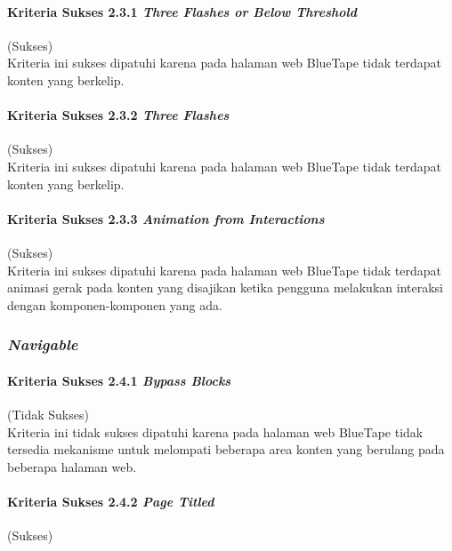 \paragraph{Kriteria Sukses 2.3.1 \textit{Three Flashes or Below Threshold}}
\label{par:kepatuhan_bluetape_kriteria_sukses_2.3.1}
(Sukses)\\

Kriteria ini sukses dipatuhi karena pada halaman web BlueTape tidak terdapat konten yang berkelip.

\paragraph{Kriteria Sukses 2.3.2 \textit{Three Flashes}}
\label{par:kepatuhan_bluetape_kriteria_sukses_2.3.2}
(Sukses)\\

Kriteria ini sukses dipatuhi karena pada halaman web BlueTape tidak terdapat konten yang berkelip.

\paragraph{Kriteria Sukses 2.3.3 \textit{Animation from Interactions}}
\label{par:kepatuhan_bluetape_kriteria_sukses_2.3.3}
(Sukses)\\

Kriteria ini sukses dipatuhi karena pada halaman web BlueTape tidak terdapat animasi gerak pada konten yang disajikan ketika pengguna melakukan interaksi dengan komponen-komponen yang ada.

\subsubsection{\textit{Navigable}}
\label{subsubsec:kepatuhan_bluetape_navigable}

\paragraph{Kriteria Sukses 2.4.1 \textit{Bypass Blocks}}
\label{par:kepatuhan_bluetape_kriteria_sukses_2.4.1}
(Tidak Sukses)\\

Kriteria ini tidak sukses dipatuhi karena pada halaman web BlueTape tidak tersedia mekanisme untuk melompati beberapa area konten yang berulang pada beberapa halaman web.

\paragraph{Kriteria Sukses 2.4.2 \textit{Page Titled}}
\label{par:kepatuhan_bluetape_kriteria_sukses_2.4.2}
(Sukses)\\

